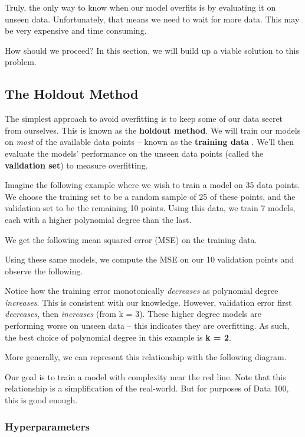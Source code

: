 \documentclass[
  letterpaper,
  DIV=11,
  numbers=noendperiod]{scrreprt}
\begin{document}
Truly, the only way to know when our model overfits is by evaluating it
on unseen data. Unfortunately, that means we need to wait for more data.
This may be very expensive and time consuming.

How should we proceed? In this section, we will build up a viable
solution to this problem.

\hypertarget{the-holdout-method}{%
\subsection{The Holdout Method}\label{the-holdout-method}}

The simplest approach to avoid overfitting is to keep some of our data
secret from ourselves. This is known as the \textbf{holdout method}. We
will train our models on \emph{most} of the available data points --
known as the \textbf{training data} . We'll then evaluate the models'
performance on the unseen data points (called the \textbf{validation
set}) to measure overfitting.

Imagine the following example where we wish to train a model on 35 data
points. We choose the training set to be a random sample of 25 of these
points, and the validation set to be the remaining 10 points. Using this
data, we train 7 models, each with a higher polynomial degree than the
last.

We get the following mean squared error (MSE) on the training data.

Using these same models, we compute the MSE on our 10 validation points
and observe the following.

Notice how the training error monotonically \emph{decreases} as
polynomial degree \emph{increases}. This is consistent with our
knowledge. However, validation error first \emph{decreases}, then
\emph{increases} (from k = 3). These higher degree models are performing
worse on unseen data -- this indicates they are overfitting. As such,
the best choice of polynomial degree in this example is \textbf{k = 2}.

More generally, we can represent this relationship with the following
diagram.

Our goal is to train a model with complexity near the red line. Note
that this relationship is a simplification of the real-world. But for
purposes of Data 100, this is good enough.

\hypertarget{hyperparameters}{%
\subsubsection{Hyperparameters}\label{hyperparameters}}
\end{document}
